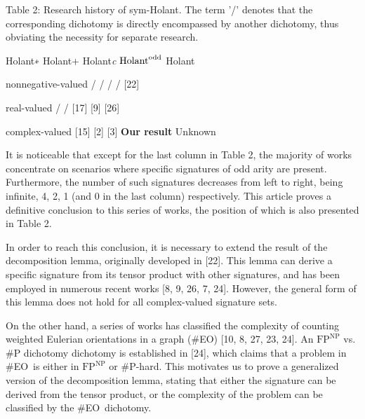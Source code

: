 \documentclass[10pt,a4paper]{article}
\begin{document}
Table 2: Research history of sym-Holant. The term ’/’ denotes that the corresponding dichotomy is directly encompassed by another dichotomy, thus obviating the necessity for separate research.





 
Holant∗ 
Holant+ 
Holant\emph{c} 
$\textup{{Holant}}^{\text{odd}}$ 
Holant 
\par


nonnegative-valued 
/ 
/ 
/ 
/ 
[22] 
\par


real-valued 
/ 
/ 
[17] 
[9] 
[26] 
\par


complex-valued 
[15] 
[2] 
[3] 
\textbf{Our result} 
Unknown 
\par









It is noticeable that except for the last column in Table 2, the majority of works concentrate on scenarios where specific signatures of odd arity are present. Furthermore, the number of such signatures decreases from left to right, being infinite, 4, 2, 1 (and 0 in the last column) respectively. This article proves a definitive conclusion to this series of works, the position of which is also presented in Table 2.\par




In order to reach this conclusion, it is necessary to extend the result of the decomposition lemma, originally developed in [22]. This lemma can derive a specific signature from its tensor product with other signatures, and has been employed in numerous recent works [8, 9, 26, 7, 24]. However, the general form of this lemma does not hold for all complex-valued signature sets.\par




On the other hand, a series of works has classified the complexity of counting weighted Eulerian orientations in a graph (\#EO) [10, 8, 27, 23, 24]. An $\text{FP}^{\text{NP}}$ vs. \#P dichotomy dichotomy is established in [24], which claims that a problem in \#EO is either in $\text{FP}^{\text{NP}}$ or \#P-hard.
This motivates us to prove a generalized version of the decomposition lemma, stating that either the signature can be derived from the tensor product, or the complexity of the problem can be classified by the \#EO dichotomy.\par
\end{document}
